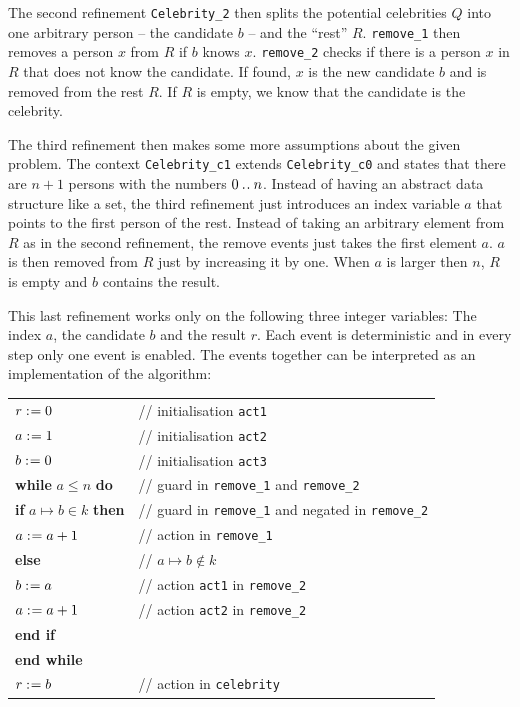 The second refinement \texttt{Celebrity\_2} then splits the
  potential celebrities $Q$ into one arbitrary person -- the candidate $b$ --
  and the ``rest'' $R$.
\texttt{remove\_1} then removes a person $x$ from $R$ if $b$ knows $x$.
\texttt{remove\_2} checks if there is a person $x$ in $R$ that does not know the candidate.
If found, $x$ is the new candidate $b$ and is removed from the rest $R$.
If $R$ is empty, we know that the candidate is the celebrity.

The third refinement then makes some more assumptions about the given problem.
The context \texttt{Celebrity\_c1} extends \texttt{Celebrity\_c0} and states that
  there are $n+1$ persons with the numbers $0\mathbin{.\mkern1mu.} n$.
Instead of having an abstract data structure like a set, the third refinement just introduces
  an index variable $a$ that points to the first person of the rest.
Instead of taking an arbitrary element from $R$ as in the second refinement, the remove
  events just takes the first element $a$. $a$ is then removed from $R$ just by increasing
  it by one.
When $a$ is larger then $n$, $R$ is empty and $b$ contains the result.

This last refinement works only on the following three integer variables: 
The index $a$, the candidate $b$ and the result $r$.
Each event is deterministic and in every step only one event is enabled.
The events together can be interpreted as an implementation of the algorithm:

\begin{tabular}{ll}
  $r \mathrel{:\mkern1mu=} 0$ & // initialisation \texttt{act1} \\
  $a \mathrel{:\mkern1mu=} 1$ & // initialisation \texttt{act2} \\
  $b \mathrel{:\mkern1mu=} 0$ & // initialisation \texttt{act3} \\
  \textbf{while} $a\leq n$ \textbf{do} & // guard in \texttt{remove\_1} and \texttt{remove\_2}\\
  \quad \textbf{if} $a\mapsto b\in k$ \textbf{then} & // guard in \texttt{remove\_1} and negated in \texttt{remove\_2}\\
  \qquad $a \mathrel{:\mkern1mu=} a+1$ & // action in \texttt{remove\_1} \\
  \quad \textbf{else} & // $a\mapsto b\not\in k$\\
  \qquad $b \mathrel{:\mkern1mu=} a$ & // action \texttt{act1} in \texttt{remove\_2} \\
  \qquad $a \mathrel{:\mkern1mu=} a+1$ & // action \texttt{act2} in \texttt{remove\_2} \\
  \quad \textbf{end if} \\
  \textbf{end while} \\
  $r \mathrel{:\mkern1mu=} b$ & // action in \texttt{celebrity}
\end{tabular}

